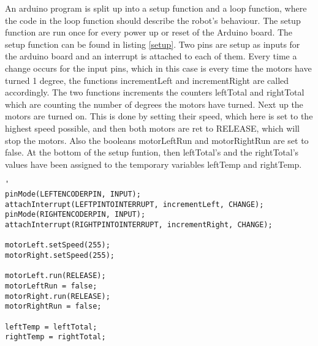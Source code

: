 An arduino program is split up into a setup function and a loop function, where the code in the loop function should describe the robot's behaviour. The setup function are run once for every power up or reset of the Arduino board.
The setup function can be found in listing \ref{setup}. Two pins are setup as inputs for the arduino board and an interrupt is attached to each of them. Every time a change occurs for the input pins, which in this case is every time the motors have turned 1 degree, the functions incrementLeft and incrementRight are called accordingly. The two functions increments the counters leftTotal and rightTotal which are counting the number of degrees the motors have turned. \newline
Next up the motors are turned on. This is done by setting their speed, which here is set to the highest speed possible, and then both motors are ret to RELEASE, which will stop the motors. Also the booleans motorLeftRun and motorRightRun are set to false. \newline
At the bottom of the setup funtion, then leftTotal's and the rightTotal's values have been assigned to the temporary variables leftTemp and rightTemp.

\begin{lstlisting}[caption={The setup function}, label={setup}]'
pinMode(LEFTENCODERPIN, INPUT);
attachInterrupt(LEFTPINTOINTERRUPT, incrementLeft, CHANGE);
pinMode(RIGHTENCODERPIN, INPUT);
attachInterrupt(RIGHTPINTOINTERRUPT, incrementRight, CHANGE);

motorLeft.setSpeed(255);
motorRight.setSpeed(255);

motorLeft.run(RELEASE);
motorLeftRun = false;
motorRight.run(RELEASE);
motorRightRun = false;

leftTemp = leftTotal;
rightTemp = rightTotal;
\end{lstlisting}

